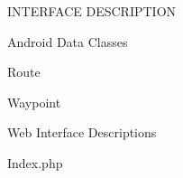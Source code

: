 \documentclass{article}
\begin{document}
\begin{section}{INTERFACE DESCRIPTION}
\begin{subsection}{Android Data Classes}
		\clearpage
		\begin{subsubsection}{Route}
			
		\end{subsubsection}
		
		\clearpage
		\begin{subsubsection}{Waypoint}
			
		\end{subsubsection}
	\end{subsection}
	
	\clearpage
	\begin{subsection}{Web Interface Descriptions}
		\begin{subsubsection}{Index.php}
			
		\end{subsubsection}
	\end{subsection}
\end{section}
\end{document}
